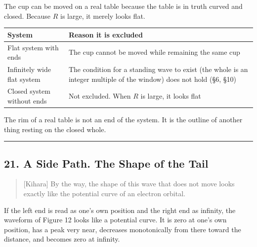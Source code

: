 \documentclass[
  a4paper,
]{article}
\newcounter{none} %
\begin{document}
The cup can be moved on a real table because the table is in truth
curved and closed. Because \(R\) is large, it merely looks flat.

{\def\LTcaptype{none} %
\begin{longtable}[]{@{}
  >{\raggedright\arraybackslash}p{}
  >{\raggedright\arraybackslash}p{}@{}}
\toprule\noalign{}
\begin{minipage}[b]{\linewidth}\raggedright
System
\end{minipage} & \begin{minipage}[b]{\linewidth}\raggedright
Reason it is excluded
\end{minipage} \\
\midrule\noalign{}
\endhead
\bottomrule\noalign{}
\endlastfoot
Flat system with ends & The cup cannot be moved while remaining the same
cup \\
Infinitely wide flat system & The condition for a standing wave to exist
(the whole is an integer multiple of the window) does not hold (§6,
§10) \\
Closed system without ends & Not excluded. When \(R\) is large, it looks
flat \\
\end{longtable}
}

The rim of a real table is not an end of the system. It is the outline
of another thing resting on the closed whole.

\begin{center}\rule{0.5\linewidth}{0.5pt}\end{center}

\subsection{21. A Side Path. The Shape of the
Tail}\label{a-side-path.-the-shape-of-the-tail}

\begin{quote}
{[}Kihara{]} By the way, the shape of this wave that does not move looks
exactly like the potential curve of an electron orbital.
\end{quote}

If the left end is read as one's own position and the right end as
infinity, the waveform of Figure 12 looks like a potential curve. It is
zero at one's own position, has a peak very near, decreases
monotonically from there toward the distance, and becomes zero at
infinity.
\end{document}

